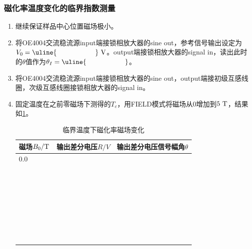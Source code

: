 \documentclass[11pt,a4paper]{ctexart}
\newcommand{\unit}[1]{\rm \ #1}
\begin{document}
\subsubsection{磁化率温度变化的临界指数测量}
  \begin{enumerate}
  \item
  继续保证样品中心位置磁场极小。
  \item
   将OE4004交流稳流源input端接锁相放大器的sine out，参考信号输出设定为$V_0 = \uline{\hspace{20mm}}\unit{V}$。output端接锁相放大器的signal in，读出此时的$\theta$值作为$\theta_I = \uline{\hspace{20mm}}$。
  \item
  将OE4004交流稳流源input端接锁相放大器的sine out，output端接初级互感线圈，次级互感线圈接锁相放大器的signal in。
  \item
 固定温度在之前零磁场下测得的$T_c$，用FIELD模式将磁场从0增加到$5\unit{T}$，结果如\cref{tableu}。
  \begin{table}[H]
\centering
\caption{临界温度下磁化率磁场变化\label{tableu}}
\begin{tabular}{|p{32mm}|p{32mm}|p{32mm}|}
\hline
磁场$B_0/{\rm T}$ & 输出差分电压$R/{V}$ & 输出差分电压信号幅角$\theta$ \\ \hline
0.0 & & \\ \hline
  & & \\ \hline
  & & \\ \hline
   & & \\ \hline
    & & \\ \hline
 & & \\ \hline
  &  &\\ \hline
  &  &\\ \hline
  &  &\\ \hline
  &  &\\ \hline
  &  &\\ \hline
  &  &\\ \hline
  &  &\\ \hline
  &  &\\ \hline
  &  &\\ \hline
  &  &\\ \hline
  &  &\\ \hline
  &  &\\ \hline
    & &\\ \hline
  & &\\ \hline
   & &\\ \hline
     &  &\\ \hline
  &  &\\ \hline
  &  &\\ \hline
  &  &\\ \hline
  &  &\\ \hline
  &  &\\ \hline
  &  &\\ \hline
  &  &\\ \hline
    & &\\ \hline
  & &\\ \hline
   & &\\ \hline
  \end{tabular}
  \end{table}
 \end{enumerate}
\end{document}
